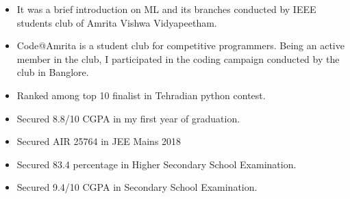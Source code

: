 \documentclass[10pt,a4paper,ragged2e]{altacv}
\begin{document}
\divider

\begin{itemize}
\item It was a brief introduction on ML and its branches conducted by IEEE students club of Amrita Vishwa Vidyapeetham.
\end{itemize}

\divider

\begin{itemize}
\item Code@Amrita is a student club for competitive programmers. Being an active member in the club, I participated in the coding campaign conducted by the club in Banglore.
\end{itemize}


\smallskip
\begin{itemize}
\item Ranked among top 10 finalist in Tehradian python contest.
\smallskip
\item Secured 8.8/10 CGPA in my first year of graduation.
\smallskip
\item Secured AIR 25764 in JEE Mains 2018
\smallskip
\item Secured 83.4 percentage in Higher Secondary School Examination.
\smallskip
\item Secured 9.4/10 CGPA in Secondary School Examination.
\end{itemize}





\end{document}
